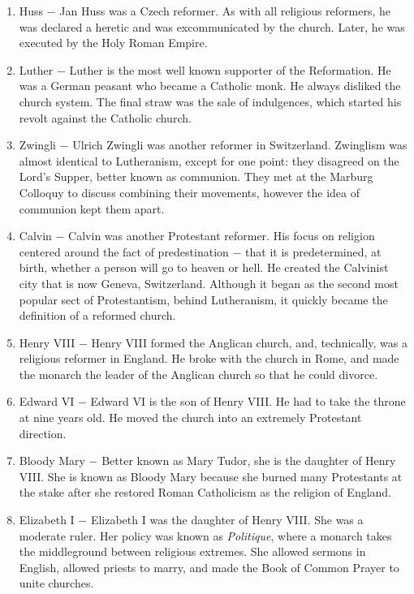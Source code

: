 \documentclass[12pt]{article}
\begin{document}
\begin{enumerate}
\item Huss $-$ Jan Huss was a Czech reformer. As with all religious reformers, he was declared a heretic and was excommunicated by the church. Later, he was executed by the Holy Roman Empire.

\item Luther $-$ Luther is the most well known supporter of the Reformation. He was a German peasant who became a Catholic monk. He always disliked the church system. The final straw was the sale of indulgences, which started his revolt against the Catholic church.

\item Zwingli $-$ Ulrich Zwingli was another reformer in Switzerland. Zwinglism was almost identical to Lutheranism, except for one point: they disagreed on the Lord's Supper, better known as communion. They met at the Marburg Colloquy to discuss combining their movements, however the idea of communion kept them apart. 

\item Calvin $-$ Calvin was another Protestant reformer. His focus on religion centered around the fact of predestination $-$ that it is predetermined, at birth, whether a person will go to heaven or hell. He created the Calvinist city that is now Geneva, Switzerland. Although it began as the second most popular sect of Protestantism, behind Lutheranism, it quickly became the definition of a reformed church.

\item Henry VIII $-$ Henry VIII formed the Anglican church, and, technically, was a religious reformer in England. He broke with the church in Rome, and made the monarch the leader of the Anglican church so that he could divorce.
    
\item Edward VI $-$ Edward VI is the son of Henry VIII. He had to take the throne at nine years old. He moved the church into an extremely Protestant direction.

\item Bloody Mary $-$ Better known as Mary Tudor, she is the daughter of Henry VIII. She is known as Bloody Mary because she burned many Protestants at the stake after she restored Roman Catholicism as the religion of England.

\item Elizabeth I $-$ Elizabeth I was the daughter of Henry VIII. She was a moderate ruler. Her policy was known as \textit{Politique}, where a monarch takes the middleground between religious extremes. She allowed sermons in English, allowed priests to marry, and made the Book of Common Prayer to unite churches.


\end{enumerate}
\end{document}
